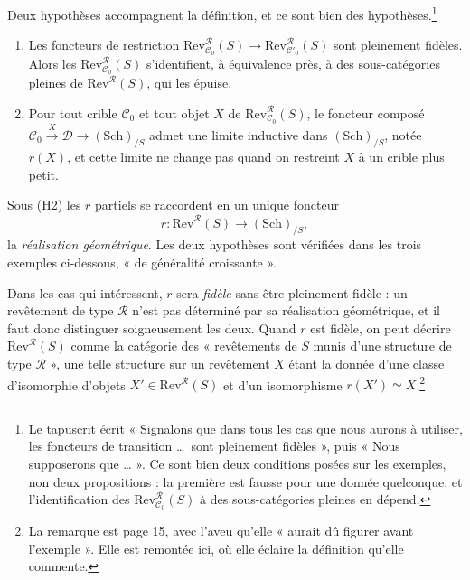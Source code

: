 \documentclass[11pt,a4paper]{article}
\begin{document}
Deux hypothèses accompagnent la définition, et ce sont bien des hypothèses.\footnote{Le tapuscrit écrit « Signalons que dans tous les cas que
nous aurons à utiliser, les foncteurs de transition …\ sont pleinement
fidèles », puis « Nous supposerons que … ». Ce sont bien deux conditions
posées sur les exemples, non deux propositions : la première est fausse pour
une donnée quelconque, et l'identification des
$\mathrm{Rev}^{\mathcal{R}}_{\mathcal{C}_{0}}(S)$ à des sous-catégories pleines
en dépend.}

\begin{enumerate}
  \item[(H1)] Les foncteurs de restriction
    $\mathrm{Rev}^{\mathcal{R}}_{\mathcal{C}_{0}}(S) \to
    \mathrm{Rev}^{\mathcal{R}}_{\mathcal{C}'_{0}}(S)$ sont pleinement fidèles.
    Alors les $\mathrm{Rev}^{\mathcal{R}}_{\mathcal{C}_{0}}(S)$ s'identifient,
    à équivalence près, à des sous-catégories pleines de
    $\mathrm{Rev}^{\mathcal{R}}(S)$, qui les épuise.
  \item[(H2)] Pour tout crible $\mathcal{C}_{0}$ et tout objet $X$ de
    $\mathrm{Rev}^{\mathcal{R}}_{\mathcal{C}_{0}}(S)$, le foncteur composé
    $\mathcal{C}_{0} \xrightarrow{\ X\ } \mathcal{D} \to (\mathrm{Sch})_{/S}$
    admet une limite inductive dans $(\mathrm{Sch})_{/S}$, notée $r(X)$, et
    cette limite ne change pas quand on restreint $X$ à un crible plus petit.
\end{enumerate}

Sous (H2) les $r$ partiels se raccordent en un unique foncteur
\[
  r : \mathrm{Rev}^{\mathcal{R}}(S) \longrightarrow (\mathrm{Sch})_{/S} ,
\]
la \emph{réalisation géométrique}. Les deux hypothèses sont vérifiées dans les
trois exemples ci-dessous, « de généralité croissante ».

Dans les cas qui intéressent, $r$ sera \emph{fidèle} sans être pleinement
fidèle : un revêtement de type $\mathcal{R}$ n'est pas
déterminé par sa réalisation géométrique, et il faut donc distinguer
soigneusement les deux. Quand $r$ est fidèle, on peut décrire
$\mathrm{Rev}^{\mathcal{R}}(S)$ comme la catégorie des « revêtements de $S$
munis d'une structure de type $\mathcal{R}$ », une telle structure sur un
revêtement $X$ étant la donnée d'une classe d'isomorphie d'objets
$X' \in \mathrm{Rev}^{\mathcal{R}}(S)$ et d'un isomorphisme
$r(X') \simeq X$.\footnote{La remarque est page 15, avec l'aveu qu'elle
« aurait dû figurer avant l'exemple ». Elle est remontée ici, où elle éclaire
la définition qu'elle commente.}
\end{document}
